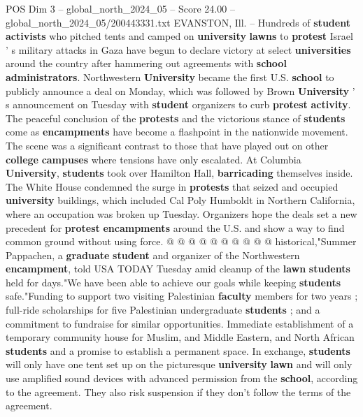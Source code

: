 \begin{textsample}{POS Dim 3 – global\_north\_2024\_05 – Score 24.00 – global\_north\_2024\_05/200443331.txt}  \label{ex:f3_pos_005}
EVANSTON, Ill. -- Hundreds of \textbf{student} \textbf{activists} who pitched tents and camped on \textbf{university} \textbf{lawns} to \textbf{protest} Israel ' s military attacks in Gaza have begun to declare victory at select \textbf{universities} around the country after hammering out agreements with \textbf{school} \textbf{administrators}.
Northwestern \textbf{University} became the first U.S. \textbf{school} to publicly announce a deal on Monday, which was followed by Brown \textbf{University} ' s announcement on Tuesday with \textbf{student} organizers to curb \textbf{protest} \textbf{activity}.
The peaceful conclusion of the \textbf{protests} and the victorious stance of \textbf{students} come as \textbf{encampments} have become a flashpoint in the nationwide movement.
The scene was a significant contrast to those that have played out on other \textbf{college} \textbf{campuses} where tensions have only escalated.
At Columbia \textbf{University}, \textbf{students} took over Hamilton Hall, \textbf{barricading} themselves inside.
The White House condemned the surge in \textbf{protests} that seized and occupied \textbf{university} buildings, which included Cal Poly Humboldt in Northern California, where an occupation was broken up Tuesday.
Organizers hope the deals set a new precedent for \textbf{protest} \textbf{encampments} around the U.S. and show a way to find common ground without using force. @ @ @ @ @ @ @ @ @ @ historical,"Summer Pappachen, a \textbf{graduate} \textbf{student} and organizer of the Northwestern \textbf{encampment}, told USA TODAY Tuesday amid cleanup of the \textbf{lawn} \textbf{students} held for days."We have been able to achieve our goals while keeping \textbf{students} safe."Funding to support two visiting Palestinian \textbf{faculty} members for two years ; full-ride scholarships for five Palestinian undergraduate \textbf{students} ; and a commitment to fundraise for similar opportunities.
Immediate establishment of a temporary community house for Muslim, and Middle Eastern, and North African \textbf{students} and a promise to establish a permanent space.
In exchange, \textbf{students} will only have one tent set up on the picturesque \textbf{university} \textbf{lawn} and will only use amplified sound devices with advanced permission from the \textbf{school}, according to the agreement.
They also risk suspension if they don't follow the terms of the agreement.

\end{textsample}
